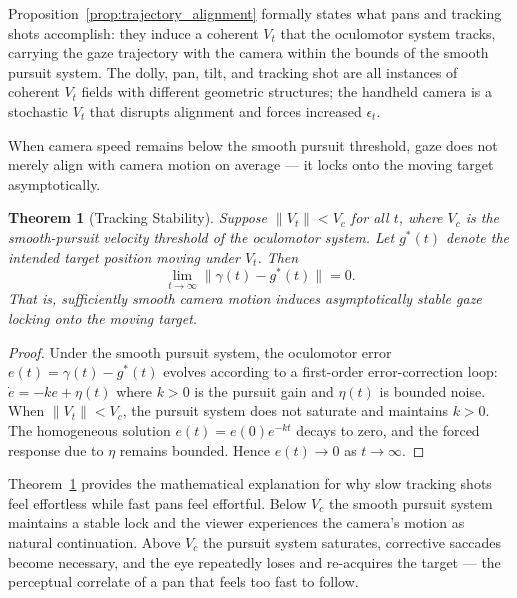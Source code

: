 \documentclass[12pt, a4paper]{article}
\theoremstyle{plain}
\newtheorem{theorem}{Theorem}[section]
\theoremstyle{definition}
\theoremstyle{remark}
\newcommand{\traj}{\gamma}
\begin{document}
Proposition~\ref{prop:trajectory_alignment} formally
states what pans and tracking shots accomplish: they induce
a coherent $V_t$ that the oculomotor system tracks,
carrying the gaze trajectory with the camera within the
bounds of the smooth pursuit system. The dolly, pan, tilt,
and tracking shot are all instances of coherent $V_t$
fields with different geometric structures; the handheld
camera is a stochastic $V_t$ that disrupts alignment and
forces increased $\epsilon_t$.

When camera speed remains below the smooth pursuit
threshold, gaze does not merely align with camera
motion on average — it locks onto the moving target
asymptotically.

\begin{theorem}[Tracking Stability]
\label{thm:tracking_stability}
  Suppose $\|V_t\| < V_c$ for all $t$, where $V_c$ is
  the smooth-pursuit velocity threshold of the oculomotor
  system. Let $g^\ast(t)$ denote the intended target
  position moving under $V_t$. Then
  \begin{equation}
    \lim_{t \to \infty}
    \bigl\| \traj(t) - g^\ast(t) \bigr\| = 0.
  \end{equation}
  That is, sufficiently smooth camera motion induces
  asymptotically stable gaze locking onto the moving
  target.
\end{theorem}

\begin{proof}
  Under the smooth pursuit system, the oculomotor error
  $e(t) = \traj(t) - g^\ast(t)$ evolves according to a
  first-order error-correction loop: $\dot{e} = -k e +
  \eta(t)$ where $k > 0$ is the pursuit gain and $\eta(t)$
  is bounded noise. When $\|V_t\| < V_c$, the pursuit
  system does not saturate and maintains $k > 0$. The
  homogeneous solution $e(t) = e(0)e^{-kt}$ decays to
  zero, and the forced response due to $\eta$ remains
  bounded. Hence $e(t) \to 0$ as $t \to \infty$.
\end{proof}

Theorem~\ref{thm:tracking_stability} provides the
mathematical explanation for why slow tracking shots feel
effortless while fast pans feel effortful. Below $V_c$
the smooth pursuit system maintains a stable lock and the
viewer experiences the camera's motion as natural
continuation. Above $V_c$ the pursuit system saturates,
corrective saccades become necessary, and the eye
repeatedly loses and re-acquires the target — the
perceptual correlate of a pan that feels too fast to
follow.
\end{document}
